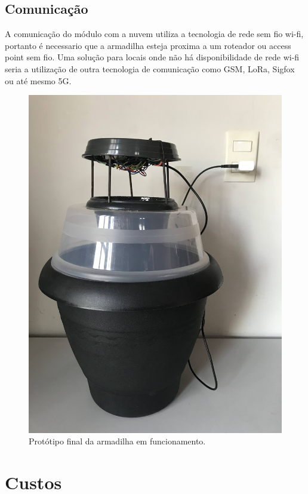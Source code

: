\documentclass[
	12pt,				%
	openright,			%
	oneside,			%
	a4paper,			%
	chapter=TITLE,		%
	english,			%
	brazil				%
	]{abntex2}
\begin{document}
\section{Comunicação}
A comunicação do módulo com a nuvem utiliza a tecnologia de rede sem fio wi-fi, portanto é necessario que a armadilha esteja proxima a um roteador ou access
point sem fio. Uma solução para locais onde não há disponibilidade de rede wi-fi seria a utilização de outra tecnologia de comunicação como GSM, LoRa, Sigfox
ou até mesmo 5G.

\begin{figure}[H]
    \centering
    \includegraphics[scale=0.09, angle=-90]{imagens/IMG_0609.jpg}
    \caption{Protótipo final da armadilha em funcionamento.}
        \label{fig:protótipofinal}
    \end{figure}

\chapter{Custos}
\end{document}
